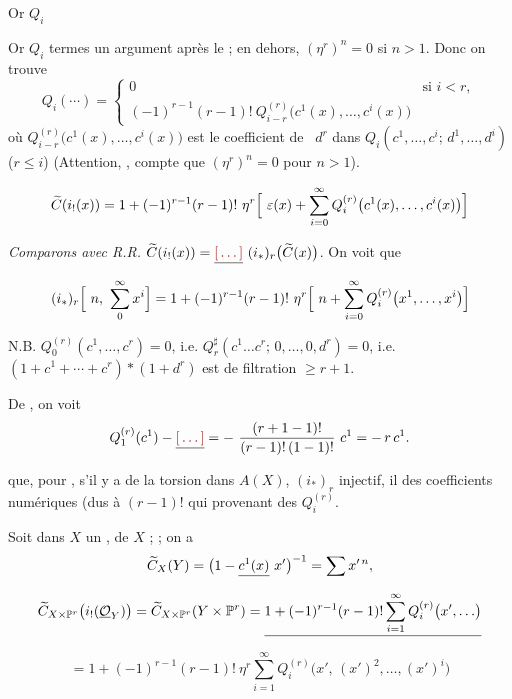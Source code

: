 \documentclass[11pt,a4paper]{article}
\begin{document}
Or $Q_{i}$ \ill{}

Or $Q_{i}$ \ill{} \emph{\ill{}} termes \ill{} \ill{} un argument après le
 ; en dehors,  $(\eta^{r})^{n} = 0$ si $n > 1$. Donc on
trouve
\[
  Q_{i}(\cdots) =
  \begin{cases}
    0 & \text{si } i < r, \\[4pt]
    (-1)^{r-1}(r-1)!\ Q^{(r)}_{i-r}\bigl(c^{1}(x), \ldots, c^{i}(x)\bigr) &
  \end{cases}
\]
où $Q^{(r)}_{i-r}\bigl(c^{1}(x), \ldots, c^{i}(x)\bigr)$ est le
coefficient de \ $d^{r}$ dans
$Q_{i}(c^{1}, \ldots, c^{i};\, d^{1}, \ldots, d^{i})$ \quad ($r \leqslant i$)
\quad (Attention, \ill{}, \ill{} compte  que
$(\eta^{r})^{n} = 0$ pour $n > 1$).

\[
  \widetilde{C}(i_{!}(x)) = 1 + (-1)^{r-1}(r-1)!\ \eta^{r}
  \Bigl[\ \varepsilon(x) + \sum_{i=0}^{\infty} Q^{(r)}_{i}\bigl(c^{1}(x), \ldots, c^{i}(x)\bigr) \Bigr]
\]

\emph{Comparons avec R.R.} \quad
$\widetilde{C}(i_{!}(x)) = \struck{\ill{}}\ (i_{*})_{r}\bigl(\widetilde{C}(x)\bigr)$.
On voit que
\[
  (i_{*})_{r}\Bigl[\ n,\ \sum_{0}^{\infty} x^{i} \Bigr]
  = 1 + (-1)^{r-1}(r-1)!\ \eta^{r}
    \Bigl[\ n + \sum_{i=0}^{\infty} Q^{(r)}_{i}\bigl(x^{1}, \ldots, x^{i}\bigr) \Bigr]
\]

N.B. $Q^{(r)}_{0}(c^{1}, \ldots, c^{r}) = 0$, i.e.
$Q_{r}^{\sharp}(c^{1} \ldots c^{r};\, 0, \ldots, 0, d^{r}) = 0$, i.e.
$(1 + c^{1} + \cdots + c^{r}) * (1 + d^{r})$ est de filtration $\geqslant r+1$.

De , on voit
\[
  Q^{(r)}_{1}(c^{1}) - \struck{\ill{}}
  = -\ \frac{(r+1-1)!}{(r-1)!\,(1-1)!}\ c^{1} = -\,r\,c^{1} .
\]

\ill{} \ill{} \ill{} que, pour \ill{}, s'il y a de la torsion dans
$A(X)$,  $(i_{*})_{r}$ \ill{} injectif, il \ill{} \ill{}
des coefficients numériques (dus  à $(r-1)!$ qui \ill{}
provenant des $Q^{(r)}_{i}$.

 Soit dans $X$ un , \ill{}
\struck{\ill{}} de $X$  ;
 ; on a
\[
  \widetilde{C}_{X}(Y) = \bigl(1 - \struck{c^{1}(x)}\ x'\bigr)^{-1} = \sum x'^{\,n} ,
\]
\[
  \widetilde{C}_{X \times \mathbb{P}^{r}}\bigl(i_{!}(\underline{\mathcal{O}}_{Y})\bigr)
  = \widetilde{C}_{X \times \mathbb{P}^{r}}(Y \times \mathbb{P}^{r})
  = \struck{1 + (-1)^{r-1}(r-1)! \sum_{i=1}^{\infty}
      Q^{(r)}_{i}\bigl(x', \ldots\bigr)}
\]
\[
  = 1 + (-1)^{r-1}(r-1)!\ \eta^{r} \sum_{i=1}^{\infty}
      Q^{(r)}_{i}\bigl(x',\, (x')^{2}, \ldots, (x')^{i}\bigr)
\]
\end{document}

